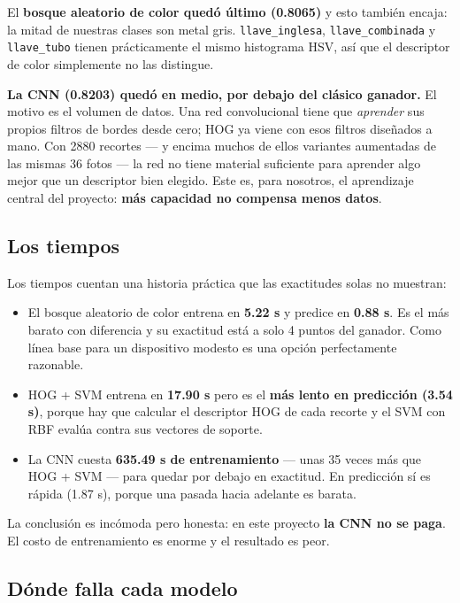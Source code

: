 \documentclass[11pt,a4paper]{article}
\newcommand{\clase}[1]{\texttt{#1}}
\begin{document}
El \textbf{bosque aleatorio de color quedó último (0.8065)} y esto también encaja: la mitad de
nuestras clases son metal gris. \clase{llave\_inglesa}, \clase{llave\_combinada} y
\clase{llave\_tubo} tienen prácticamente el mismo histograma HSV, así que el descriptor de color
simplemente no las distingue.

\textbf{La CNN (0.8203) quedó en medio, por debajo del clásico ganador.} El motivo es el volumen de
datos. Una red convolucional tiene que \emph{aprender} sus propios filtros de bordes desde cero;
HOG ya viene con esos filtros diseñados a mano. Con 2880 recortes --- y encima muchos de ellos
variantes aumentadas de las mismas 36 fotos --- la red no tiene material suficiente para aprender
algo mejor que un descriptor bien elegido. Este es, para nosotros, el aprendizaje central del
proyecto: \textbf{más capacidad no compensa menos datos}.

\subsection{Los tiempos}

Los tiempos cuentan una historia práctica que las exactitudes solas no muestran:

\begin{itemize}
  \item El bosque aleatorio de color entrena en \textbf{5.22 s} y predice en \textbf{0.88 s}. Es el
        más barato con diferencia y su exactitud está a solo 4 puntos del ganador. Como línea base
        para un dispositivo modesto es una opción perfectamente razonable.
  \item HOG + SVM entrena en \textbf{17.90 s} pero es el \textbf{más lento en predicción
        (3.54 s)}, porque hay que calcular el descriptor HOG de cada recorte y el SVM con RBF
        evalúa contra sus vectores de soporte.
  \item La CNN cuesta \textbf{635.49 s de entrenamiento} --- unas 35 veces más que HOG + SVM ---
        para quedar por debajo en exactitud. En predicción sí es rápida (1.87 s), porque una pasada
        hacia adelante es barata.
\end{itemize}

La conclusión es incómoda pero honesta: en este proyecto \textbf{la CNN no se paga}. El costo de
entrenamiento es enorme y el resultado es peor.

\subsection{Dónde falla cada modelo}
\end{document}
